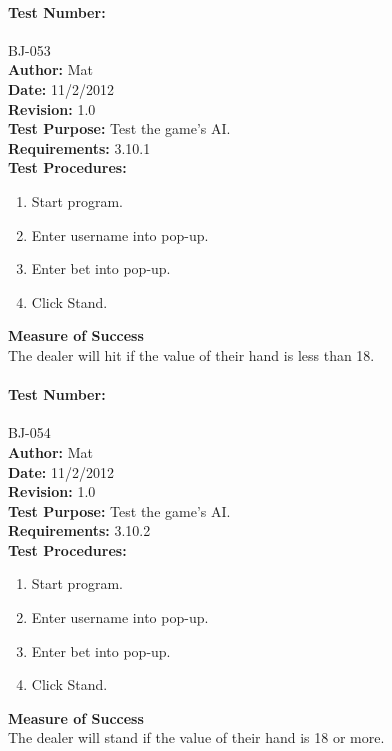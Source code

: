 \documentclass{article}
\begin{document}
\paragraph{Test Number:} BJ-053\\
\textbf{Author:} Mat\\
\textbf{Date:} 11/2/2012\\
\textbf{Revision:} 1.0\\
\textbf{Test Purpose:} Test the game's AI. \\
\textbf{Requirements:} 3.10.1 \\
\textbf{Test Procedures:} 
\begin{enumerate}
\item Start program.
\item Enter username into pop-up.
\item Enter bet into pop-up.
\item Click Stand.
\end{enumerate}
\textbf{Measure of Success}\\The dealer will hit if the value of their hand is less than 18.
\paragraph{Test Number:} BJ-054\\
\textbf{Author:} Mat\\
\textbf{Date:} 11/2/2012\\
\textbf{Revision:} 1.0\\
\textbf{Test Purpose:} Test the game's AI. \\
\textbf{Requirements:} 3.10.2 \\
\textbf{Test Procedures:} 
\begin{enumerate}
\item Start program.
\item Enter username into pop-up.
\item Enter bet into pop-up.
\item Click Stand.
\end{enumerate}
\textbf{Measure of Success}\\The dealer will stand if the value of their hand is 18 or more.
\end{document}
